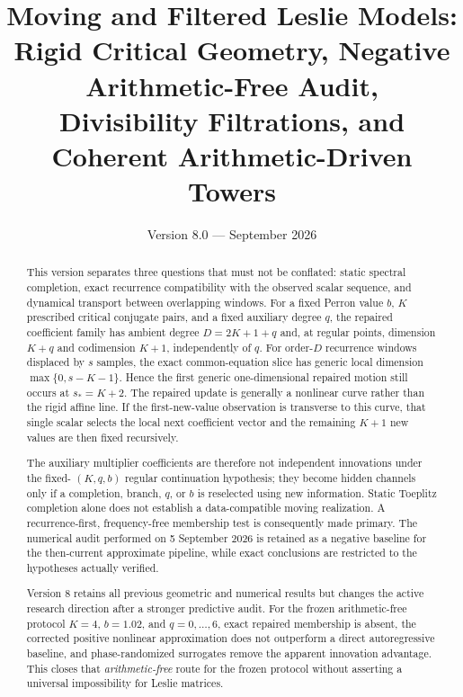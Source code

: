 \documentclass[11pt]{amsart}
\title[Arithmetic-Driven Leslie Towers]{Moving and Filtered Leslie Models:\\Rigid Critical Geometry, Negative Arithmetic-Free Audit,\\Divisibility Filtrations, and Coherent Arithmetic-Driven Towers}
\author{}
\date{Version 8.0 --- September 2026}
\numberwithin{equation}{section}
\theoremstyle{plain}
\theoremstyle{definition}
\theoremstyle{remark}
\begin{document}
\begin{abstract}
This version separates three questions that must not be conflated: static spectral completion,
exact recurrence compatibility with the observed scalar sequence, and dynamical transport between
overlapping windows. For a fixed Perron value $b$, $K$ prescribed critical conjugate pairs, and a
fixed auxiliary degree $q$, the repaired coefficient family has ambient degree $D=2K+1+q$ and,
at regular points, dimension $K+q$ and codimension $K+1$, independently of $q$. For order-$D$
recurrence windows displaced by $s$ samples, the exact common-equation slice has generic local
dimension $\max\{0,s-K-1\}$. Hence the first generic one-dimensional repaired motion still occurs
at $s_*=K+2$. The repaired update is generally a nonlinear curve rather than the rigid affine line.
If the first-new-value observation is transverse to this curve, that single scalar selects the local
next coefficient vector and the remaining $K+1$ new values are then fixed recursively.

The auxiliary multiplier coefficients are therefore not independent innovations under the fixed-
$(K,q,b)$ regular continuation hypothesis; they become hidden channels only if a completion,
branch, $q$, or $b$ is reselected using new information. Static Toeplitz completion alone does not
establish a data-compatible moving realization. A recurrence-first, frequency-free membership test
is consequently made primary. The numerical audit performed on 5 September 2026 is retained as a
negative baseline for the then-current approximate pipeline, while exact conclusions are restricted
to the hypotheses actually verified.

Version 8 retains all previous geometric and numerical results but changes the active research
direction after a stronger predictive audit.  For the frozen arithmetic-free protocol
$K=4$, $b=1.02$, and $q=0,\ldots,6$, exact repaired membership is absent, the corrected
positive nonlinear approximation does not outperform a direct autoregressive baseline, and
phase-randomized surrogates remove the apparent innovation advantage.  This closes that
\emph{arithmetic-free} route for the frozen protocol without asserting a universal impossibility
for Leslie matrices.


\end{abstract}
\end{document}
